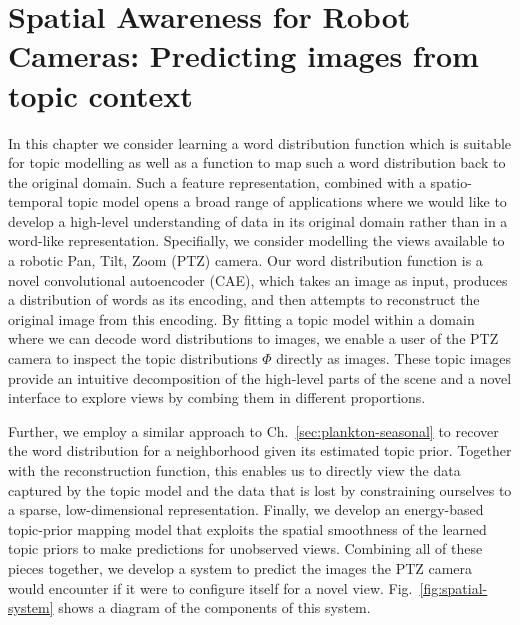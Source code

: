 
\chapter{Spatial Awareness for Robot Cameras: Predicting images from topic context} \label{ch:spatial-prediction}

In this chapter we consider learning a word distribution function which is suitable for topic modelling as well as a function to map such a word distribution back to the original domain. Such a feature representation, combined with a spatio-temporal topic model opens a broad range of applications where we would like to develop a high-level understanding of data in its original domain rather than in a word-like representation. Specifially, we consider modelling the views available to a robotic Pan, Tilt, Zoom (PTZ) camera. Our word distribution function is a novel convolutional autoencoder (CAE), which takes an image as input, produces a distribution of words as its encoding, and then attempts to reconstruct the original image from this encoding. By fitting a topic model within a domain where we can decode word distributions to images, we enable a user of the PTZ camera to inspect the topic distributions $\Phi$ directly as images. These topic images provide an intuitive decomposition of the high-level parts of the scene and a novel interface to explore views by combing them in different proportions.

Further, we employ a similar approach to Ch.~\ref{sec:plankton-seasonal} to recover the word distribution for a neighborhood given its estimated topic prior. Together with the reconstruction function, this enables us to directly view the data captured by the topic model and the data that is lost by constraining ourselves to a sparse, low-dimensional representation. Finally, we develop an energy-based topic-prior mapping model that exploits the spatial smoothness of the learned topic priors to make predictions for unobserved views. Combining all of these pieces together, we develop a system to predict the images the PTZ camera would encounter if it were to configure itself for a novel view. Fig.~\ref{fig:spatial-system} shows a diagram of the components of this system.

